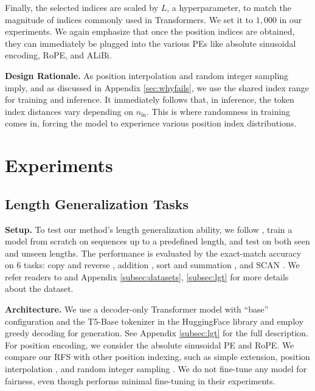 \documentclass[11pt]{article}
\begin{document}
Finally, the selected indices are scaled by $L$, a hyperparameter, to match the magnitude of indices commonly used in Transformers. We set it to $1,000$ in our experiments.
We again emphasize that once the position indices are obtained, they can immediately be plugged into the various PEs like absolute sinusoidal encoding, RoPE, and ALiBi.

\noindent\textbf{Design Rationale.} As position interpolation and random integer sampling imply, and as discussed in Appendix \ref{sec:whyfails}, we use the shared index range for training and inference. It immediately follows that, in inference, the token index distances vary depending on $n_{\text{in}}$. This is where randomness in training comes in, forcing the model to experience various position index distributions.

\section{Experiments}\label{experiments}

\subsection{Length Generalization Tasks}\label{subsec:lg}

\textbf{Setup.} To test our method's length generalization ability, we follow \citet{kazemnejad2023impact}, train a model from scratch on sequences up to a predefined length, and test on both seen and unseen lengths. The performance is evaluated by the exact-match accuracy on 6 tasks: copy and reverse \cite{ontanon-etal-2022-making}, addition \cite{nye2021workscratchpadsintermediatecomputation}, sort and summation \cite{saxton2019analysing}, and SCAN \cite{pmlr-v80-lake18a}. We refer readers to \citet{kazemnejad2023impact} and Appendix \ref{subsec:datasets}, \ref{subsec:lgt} for more details about the dataset.

\noindent\textbf{Architecture.} We use a decoder-only Transformer model with ``base'' configuration and the T5-Base tokenizer in the HuggingFace library \cite{wolf-etal-2020-transformers} and employ greedy decoding for generation. See Appendix \ref{subsec:lgt} for the full description. 
For position encoding, we consider the absolute sinusoidal PE and RoPE.
We compare our RFS with other position indexing, such as simple extension, position interpolation \cite{chen2023extendingcontextwindowlarge}, and random integer sampling \cite{ruoss-etal-2023-randomized}.
We do not fine-tune any model for fairness, even though \citet{chen2023extendingcontextwindowlarge} performs minimal fine-tuning in their experiments.
\end{document}
